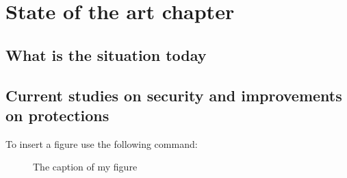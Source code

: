 \documentclass[a4paper]{usiinfbachelorproject}
\begin{document}
\section{\textbf{State of the art chapter}}
\subsection{\textbf{What is the situation today}}


\subsection{\textbf{Current studies on security and improvements on protections}}




To insert a figure use the following command:

\begin{figure}[h!]
	\caption{The caption of my figure}\label{fig:flower}
\end{figure}
\end{document}
